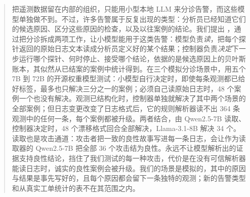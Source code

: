 \begin{abstract}
把遥测数据留在内部的组织，只能用小型本地 LLM 来分诊告警，而这些模型单独做不到。不过，许多告警属于反复出现的类型：分析员已经知道它们的候选原因、区分这些原因的检查，以及以往案例的结论。我们提出 \hesp{}，通过把分诊拆成两项工作，让小模型能用于这类告警：模型负责\emph{读}，把每个探针返回的原始日志文本读成分析员定义好的某个结果；控制器负责\emph{决定}下一步运行哪个探针、何时停止、接受哪个结论，依据的是候选原因上的贝叶斯账本，其似然从已结案的案例中统计得到。在三个模拟分诊场景中，用五个 7B 到 72B 的开源权重模型测试：小模型自行决定时，即使每条观测都已给好标签，最多也只解决三分之一的案例；必须自己读原始日志时，48 个案例一个也没有解决。观测已结构化时，控制器单独就解决了其中两个场景的全部案例；但日志变更改变了日志格式后，它的规则解析器读不出 364 条观测中的任何一条，每个案例都被升级。两者结合，由 Qwen2.5-7B 读取、控制器决定时，48 个漂移格式回合全部解决，Llama-3.1-8B 解决 34 个。读取也是攻击通道：攻击者把一致的良性故事写进每一条日志，会让作为读取器的 Qwen2.5-7B 把全部 36 个攻击结为良性。永远不让模型解析出的证据支持良性结论，挡住了我们测试的每一种攻击，代价是在没有可信解析器能读日志时，诚实的良性案例会被升级。我们的场景是模拟的，其中的原因与结果是事先写好的，且每个原因都会留下一条独特的观测；新的告警类型和从真实工单统计的表不在其范围之内。
\end{abstract}
